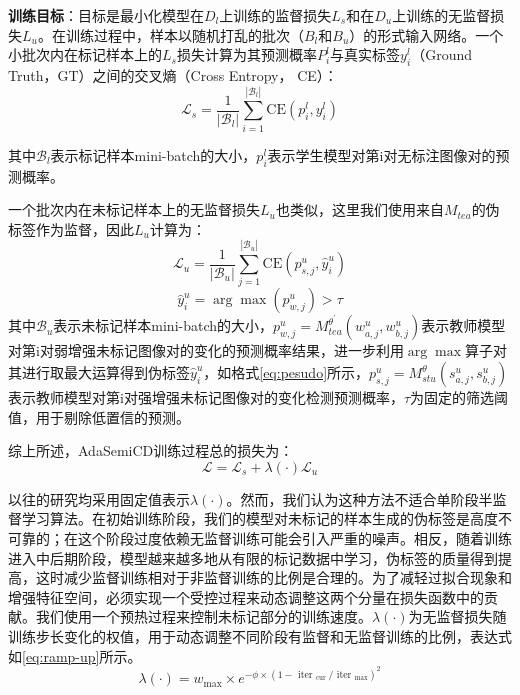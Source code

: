 \documentclass[lang=chs, degree=master, blindreview=false, adobe=false]{yanputhesis}
\begin{document}
\textbf{训练目标}：目标是最小化模型在$D_{l}$上训练的监督损失$L_s$和在$D_{u}$上训练的无监督损失$L_u$。在训练过程中，样本以随机打乱的批次（$B_l$和$B_u$）的形式输入网络。一个小批次内在标记样本上的$L_s$损失计算为其预测概率$P_{i}^{l}$与真实标签$y_{i}^{l}$（Ground Truth，GT）之间的交叉熵（Cross Entropy， CE）：
\begin{equation}
  \label{eq:AdaLossS}
  \mathcal{L}_{s}=\frac{1}{\left|\mathcal{B}_{l}\right|} \sum_{i=1}^{\left|\mathcal{B}_{l}\right|} \mathrm{CE}\left(p_{i}^{l}, y_{i}^{l}\right)
\end{equation}

其中$\mathcal{B}_{l}$表示标记样本mini-batch的大小，$p_{i}^{l}$表示学生模型对第i对无标注图像对的预测概率。

一个批次内在未标记样本上的无监督损失$L_u$也类似，这里我们使用来自$M_{tea}$的伪标签作为监督，因此$L_u$计算为：
\begin{equation}
  \label{eq:AdaLossU}
  \mathcal{L}_{u}=\frac{1}{\left|\mathcal{B}_{u}\right|} \sum_{j=1}^{\left|\mathcal{B}_{u}\right|} \mathrm{CE}\left(p_{s, j}^{u}, \hat{y}^{u}_{i}\right)
\end{equation}
\begin{equation}
  \label{eq:pesudo}
  \hat{y}^{u}_{i}={\arg \max } \left(p_{w, j}^{u}\right)>\tau
\end{equation}
其中$\mathcal{B}_{u}$表示未标记样本mini-batch的大小，$p_{w, j}^{u}=M_{t e a}^{\theta^{\prime}}\left(w_{a, j}^{u}, w_{b, j}^{u}\right)$表示教师模型对第i对弱增强未标记图像对的变化的预测概率结果，进一步利用$\arg \max$算子对其进行取最大运算得到伪标签$\hat{y}^{u}_{i}$，如格式\ref{eq:pesudo}所示，$p_{s, j}^{u}=M_{s t u}^{\theta}\left(s_{a, j}^{u}, s_{b, j}^{u}\right)$表示教师模型对第i对强增强未标记图像对的变化检测预测概率，$\tau$为固定的筛选阈值，用于剔除低置信的预测。

综上所述，AdaSemiCD训练过程总的损失为：
\begin{equation}
  \label{eq:AdaLoss}
  \mathcal{L}=\mathcal{L}_{s}+\lambda(\cdot) \mathcal{L}_{u}
\end{equation}

以往的研究\cite{sohn2020fixmatch}\cite{transformation_medical}均采用固定值表示$\lambda(\cdot)$。然而，我们认为这种方法不适合单阶段半监督学习算法。在初始训练阶段，我们的模型对未标记的样本生成的伪标签是高度不可靠的；在这个阶段过度依赖无监督训练可能会引入严重的噪声。相反，随着训练进入中后期阶段，模型越来越多地从有限的标记数据中学习，伪标签的质量得到提高，这时减少监督训练相对于非监督训练的比例是合理的。为了减轻过拟合现象和增强特征空间，必须实现一个受控过程来动态调整这两个分量在损失函数中的贡献。我们使用一个预热过程来控制未标记部分的训练速度。$\lambda(\cdot)$为无监督损失随训练步长变化的权值，用于动态调整不同阶段有监督和无监督训练的比例，表达式如\ref{eq:ramp-up}所示。
\begin{equation}
  \label{eq:ramp-up}
  \lambda(\cdot)=w_{\max } \times e^{-\phi \times\left(1-\text { iter }_{\text {cur }} / \text { iter }_{\max }\right)^{2}}
\end{equation}
\end{document}
